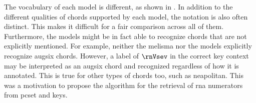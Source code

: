 
The vocabulary of each model is different, as shown in
. In addition to the different
qualities of chords supported by each model, the notation is
also often distinct. This makes it difficult for a fair
comparison across all of them. Furthermore, the models might
be in fact able to recognize chords that are not explicitly
mentioned. For example, neither the \gls{melisma} nor the
\textcite{mcleod2021modular} models explicitly recognize
\gls{augsix} chords. However, a label of $\rnVsev$ in the
correct key context may be interpreted as an \gls{augsix}
chord and recognized regardless of how it is annotated. This
is true for other types of chords too, such as
\gls{neapolitan}. This was a motivation to propose the
\algorithmrn{} algorithm for the retrieval of \gls{rna}
numerators from \gls{pcset} and keys. 

